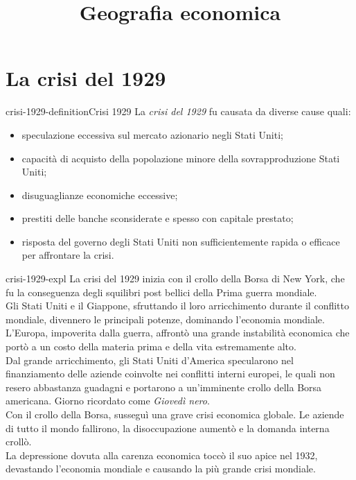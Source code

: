 \documentclass[preview]{standalone}
\begin{document}
\title{Geografia economica}
\genpage

\section{La crisi del 1929}

\begin{snippetdefinition}{crisi-1929-definition}{Crisi 1929}
    La \textit{crisi del 1929} fu causata da diverse cause quali:
    \begin{itemize}
        \item speculazione eccessiva sul mercato azionario negli Stati Uniti;
        \item capacità di acquisto della popolazione minore della sovrapproduzione Stati Uniti;
        \item disuguaglianze economiche eccessive;
        \item prestiti delle banche sconsiderate e spesso con capitale prestato;
        \item risposta del governo degli Stati Uniti non sufficientemente rapida o efficace per affrontare la crisi.
    \end{itemize}
\end{snippetdefinition}

\begin{snippet}{crisi-1929-expl}
    La crisi del 1929 inizia con il crollo della Borsa di New York, che fu la conseguenza degli
    squilibri post bellici della Prima guerra mondiale.
    \\
    Gli Stati Uniti e il Giappone, sfruttando il loro arricchimento durante il conflitto mondiale,
    divennero le principali potenze, dominando l'economia mondiale.
    \\
    L'Europa, impoverita dalla guerra, affrontò una grande instabilità economica che portò a un
    costo della materia prima e della vita estremamente alto.
    \\
    Dal grande arricchimento, gli Stati Uniti d'America specularono nel finanziamento delle aziende
    coinvolte nei conflitti interni europei, le quali non resero abbastanza guadagni e portarono a
    un'imminente crollo della Borsa americana. Giorno ricordato come \textit{Giovedì nero}.
    \\
    Con il crollo della Borsa, susseguì una grave crisi economica globale.
    Le aziende di tutto il mondo fallirono, la disoccupazione aumentò e la domanda interna crollò.
    \\
    La depressione dovuta alla carenza economica toccò il suo apice nel 1932, devastando l'economia
    mondiale e causando la più grande crisi mondiale.
\end{snippet}
\end{document}
